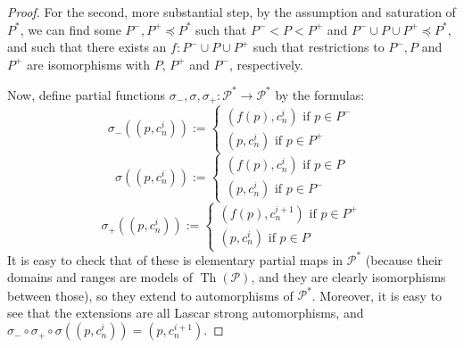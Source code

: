 \documentclass[final,a4paper,12pt]{amsart}
\theoremstyle{remark}
\theoremstyle{definition}
\DeclareMathOperator{\Th}{{Th}}
\begin{document}
\begin{proof}
		For the second, more substantial step, by the assumption and saturation of $P^*$, we can find some $P^-,P^+\preceq P^*$ such that $P^-<P<P^+$ and $P^-\cup P\cup P^+\preceq P^*$, and such that there exists an $f\colon P^-\cup P\cup P^+$ such that restrictions to $P^-,P$ and $P^+$ are isomorphisms with $P$, $P^+$ and $P^-$, respectively.
		
		Now, define partial functions $\sigma_-,\sigma,\sigma_+\colon \mathcal P^*\to \mathcal P^*$ by the formulas:
		\[
		\sigma_-((p,c_n^i)):=\begin{cases} (f(p),c_n^i)\textrm{ if }p\in P^-\\ (p,c_n^i)\textrm{ if }p\in P^+ \end{cases}
		\]
		\[
		\sigma((p,c_n^i)):=\begin{cases} (f(p),c_n^i)\textrm{ if }p\in P\\ (p,c_n^i)\textrm{ if }p\in P^- \end{cases}
		\]
		\[
		\sigma_+((p,c_n^i)):=\begin{cases} (f(p),c_n^{i+1})\textrm{ if }p\in P^+\\ (p,c_n^i)\textrm{ if }p\in P \end{cases}
		\]
		It is easy to check that of these is elementary partial maps in $\mathcal P^*$ (because their domains and ranges are models of $\Th(\mathcal P)$, and they are clearly isomorphisms between those), so they extend to automorphisms of $\mathcal P^*$. Moreover, it is easy to see that the extensions are all Lascar strong automorphisms, and $\sigma_-\circ\sigma_+\circ\sigma((p,c_n^i))=(p,c_n^{i+1})$.
	\end{proof}
	
\end{document}
